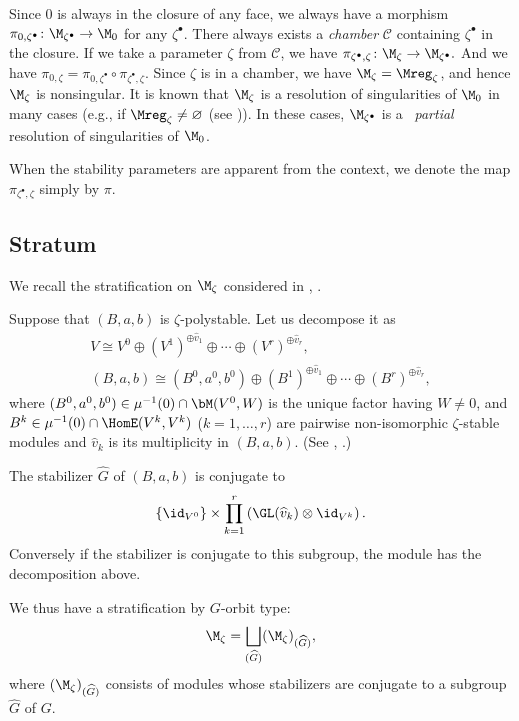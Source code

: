Since $0$ is always in the closure of any face, we always have a
morphism
\(
  \pi_{0,\zeta^\bullet}\colon \M_{\zeta^\bullet}\to \M_0
\)
for any $\zeta^\bullet$. There always exists a {\it chamber\/} $\mathcal C$
containing $\zeta^\bullet$ in the closure. If we take a parameter $\zeta$
from $\mathcal C$, we have
\(
  \pi_{\zeta^\bullet,\zeta}\colon \M_{\zeta}\to \M_{\zeta^\bullet}.
\)
And we have $\pi_{0,\zeta} =
\pi_{0,\zeta^\bullet}\circ\pi_{\zeta^\bullet,\zeta}$. Since
$\zeta$ is in a chamber, we have $\M_{\zeta} = \Mreg_{\zeta}$, and
hence $\M_{\zeta}$ is nonsingular. It is known that
$\M_{\zeta}$ is a resolution of singularities of $\M_0$ in many cases
(e.g., if $\Mreg_{\zeta}\neq\varnothing$ (see
\cite[Theorem~4.1]{Na-quiver})). In these cases, $\M_{\zeta^\bullet}$ is a~{\it
  partial} resolution of singularities of $\M_0$.

When the stability parameters are apparent from the context, we denote
the map $\pi_{\zeta^\bullet,\zeta}$ simply by $\pi$.

\subsection{Stratum}\label{subsec:stratum}

We recall the stratif\/ication on $\M_\zeta$ considered in
\cite[Section~6]{Na-quiver}, \cite[Section~3]{Na-alg}.

Suppose that $(B,a,b)$ is $\zeta$-polystable. Let us decompose it as
\begin{gather}
     V \cong V^0 \oplus (V^1)^{\oplus {\widehat v}_1}\oplus \cdots \oplus
   (V^r)^{\oplus {\widehat v}_r},
\nonumber\\
     (B,a,b) \cong (B^0,a^0,b^0) \oplus
   (B^1)^{\oplus {\widehat v}_1} \oplus \cdots \oplus
   (B^r)^{\oplus {\widehat v}_r},\label{eq:decomp}
\end{gather}
where $(B^0,a^0,b^0)\in\mu^{-1}(0)\cap\bM(V^0,W)$ is the unique factor
having $W\neq 0$, and $B^k\in \mu^{-1}(0)\cap\HomE(V^k,V^k)$
($k=1,\dots,r$) are pairwise non-isomorphic $\zeta$-stable modules
and ${\widehat v}_k$ is its multiplicity in $(B,a,b)$. (See
\cite[6.5]{Na-quiver}, \cite[3.27]{Na-alg}.)

The stabilizer $\widehat G$ of $(B,a,b)$ is conjugate to
\[
   \{ \id_{V^0} \} \times
   \prod_{k=1}^r \left(\GL(\widehat{v}_k)\otimes \id_{V^k}\right).
\]
Conversely if the stabilizer is conjugate to this subgroup, the module
has the decomposition above.

We thus have a stratif\/ication by $G$-orbit type:
\begin{equation*}
   \M_\zeta = \bigsqcup_{(\widehat G)} (\M_\zeta)_{(\widehat G)},
\end{equation*}
where $(\M_\zeta)_{(\widehat G)}$ consists of modules whose
stabilizers are conjugate to a subgroup $\widehat G$ of $G$.

